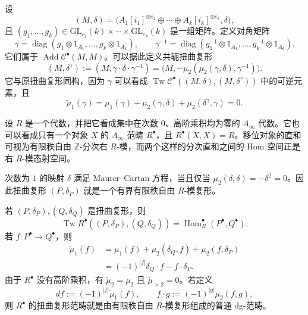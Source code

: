 \begin{note}\label{note:conjugation-twisted-complex}
设
\[
  (M,\delta)=
  \bigl(A_1[i_1]^{\oplus e_1}\oplus\cdots\oplus
  A_k[i_k]^{\oplus e_k},\delta\bigr),
\]
且 $(g_1,\ldots,g_k)\in
\mathrm{GL}_{e_1}(k)\times\cdots\times\mathrm{GL}_{e_k}(k)$ 是一组矩阵。定义对角矩阵
\[
  \gamma=\operatorname{diag}(g_1\otimes1_{A_1},\ldots,g_k\otimes1_{A_k}),
  \qquad
  \gamma^{-1}=\operatorname{diag}(g_1^{-1}\otimes1_{A_1},\ldots,
                                  g_k^{-1}\otimes1_{A_k}).
\]
它们属于 $\operatorname{Add}\mathcal C^\bullet(M,M)$。可以据此定义共轭扭曲复形
\[
  (M,\delta^\gamma):=
  (M,\gamma\cdot\delta\cdot\gamma^{-1})
  =\bigl(M,-\mu_2(\mu_2(\gamma,\delta),\gamma^{-1})\bigr).
\]
它与原扭曲复形同构，因为 $\gamma$ 可以看成 $\operatorname{Tw}\mathcal C^\bullet((M,\delta),(M,\delta^\gamma))$ 中的可逆元素，且
\[
  \widetilde\mu_1(\gamma)
  =\mu_1(\gamma)+\mu_2(\gamma,\delta)
    +\mu_2(\delta^\gamma,\gamma)=0.
\]
\end{note}

\begin{example}[代数上的扭曲复形]\label{ex:twisted-complexes-algebra}
设 $R$ 是一个代数，并把它看成集中在次数 $0$、高阶乘积均为零的 $A_\infty$ 代数。它也可以看成只有一个对象 $X$ 的 $A_\infty$ 范畴 $R^\bullet$，且 $R^\bullet(X,X)=R$。移位对象的直和可视为有限秩自由 $\mathbb Z$-分次右 $R$-模，而两个这样的分次直和之间的 Hom 空间正是右 $R$-模态射空间。

次数为 $1$ 的映射 $\delta$ 满足 Maurer--Cartan 方程，当且仅当 $\mu_2(\delta,\delta)=-\delta^2=0$。因此扭曲复形 $(P,\delta_P)$ 就是一个有界有限秩自由 $R$-模复形。

若 $(P,\delta_P),(Q,\delta_Q)$ 是扭曲复形，则
\[
  \operatorname{Tw}R^\bullet((P,\delta_P),(Q,\delta_Q))
  =\operatorname{Hom}_R^\bullet(P^\bullet,Q^\bullet).
\]
若 $f\colon P^\bullet\to Q^\bullet$，则
\begin{align*}
  \widetilde\mu_1(f)
  &=\mu_1(f)+\mu_2(\delta_Q,f)+\mu_2(f,\delta_P)\\
  &=(-1)^{|f|}\delta_Q\cdot f-f\cdot\delta_P.
\end{align*}
由于 $R^\bullet$ 没有高阶乘积，有 $\widetilde\mu_2=\mu_2$ 且 $\widetilde\mu_{>2}=0$。若定义
\[
  df:=(-1)^{|f|}\widetilde\mu_1(f),
  \qquad
  f\cdot g:=(-1)^{|g|}\mu_2(f,g),
\]
则 $R^\bullet$ 的扭曲复形范畴就是由有限秩自由 $R$-模复形组成的普通 dg-范畴。
\end{example}

